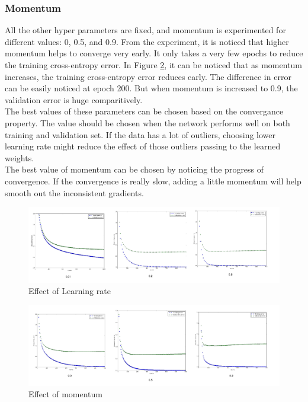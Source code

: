 \documentclass{article}
\begin{document}
\subsubsection*{Momentum}
All the other hyper parameters are fixed, and momentum is experimented for different values: 0, 0.5, and 0.9. From the experiment, it is noticed that higher momentum helps to converge very early. It only takes a very few epochs to reduce the training cross-entropy error. In Figure \ref{fig:5d2}, it can be noticed that as momentum increases, the training cross-entropy error reduces  early. The difference in error can be easily noticed at epoch 200. But when momentum is increased to 0.9, the validation error is huge comparitively. \\

The best values of these parameters can be chosen based on the convergance property. The value should be chosen when the network performs well on both training and validation set. If the data has a lot of outliers, choosing lower learning rate might reduce the effect of those outliers passing to the learned weights. \\

The best value of momentum can be chosen by noticing the progress of convergence. If the convergence is really slow, adding a little momentum will help smooth out the inconsistent gradients.

\begin{figure}[!h]
  \centering
  \includegraphics[width=\textwidth]{figures/5d1}
  \caption{Effect of Learning rate}
  \label{fig:5d1}
\end{figure}

\begin{figure}[!h]
  \centering
  \includegraphics[width=\textwidth]{figures/5d2}
  \caption{Effect of momentum}
  \label{fig:5d2}
\end{figure}
\end{document}
